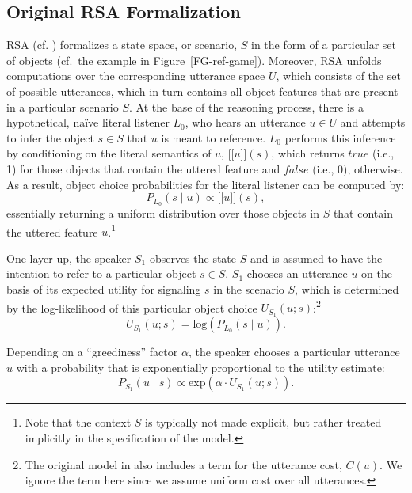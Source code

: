 \documentclass[10pt,a4paper]{article}
\newcommand{\sem}[1]{\mbox{$[\![$#1$]\!]$}}
\begin{document}
\subsection*{Original RSA Formalization}
RSA (cf. ) formalizes a state space, or scenario, $S$ in the form of a particular set of objects (cf.~the example in Figure~\ref{FG-ref-game}). 
Moreover, RSA unfolds computations over the corresponding utterance space $U$, which consists of the set of possible utterances, which in turn contains all object features that are present in a particular scenario $S$.
At the base of the reasoning process, there is a hypothetical, na\"ive literal listener $L_0$, who hears an utterance $u\in U$ and attempts to infer the object $s \in S$ that $u$ is meant to reference. 
$L_0$ performs this inference by conditioning on the literal semantics of $u$, \sem{$u$}$(s)$, which returns $true$ (i.e., 1) for those objects that contain the uttered feature and $false$ (i.e., 0), otherwise.
As a result, object choice probabilities for the literal listener can be computed by: 
\begin{equation}
P_{L_{0}}(s\mid u) \propto \sem{$u$}(s),
\end{equation}
essentially returning a uniform distribution over those objects in $S$ that contain the uttered feature $u$.\footnote{Note that the context $S$ is typically not made explicit, but rather treated implicitly in the specification of the model.}


One layer up, the speaker $S_1$ observes the state $S$ and is assumed to have the intention to refer to a particular object $s \in S$.
$S_1$ chooses an utterance $u$ on the basis of its expected utility for signaling $s$ in the scenario $S$, which is determined by the log-likelihood of this particular object choice $U_{S_1}(u;s)$:\footnote{The original model in  also includes a term for the utterance cost, $C(u)$. We ignore the term here since we assume uniform cost over all utterances.}
\begin{equation}
U_{S_{1}}(u;s) = \textrm{log}(P_{L_{0}}(s \mid u)).
\end{equation}

Depending on a ``greediness'' factor $\alpha$, the speaker chooses a particular utterance $u$ with a probability that is exponentially proportional to the utility estimate: 
\begin{equation}
P_{S_{1}} (u \mid s) \propto   \textrm{exp}(\alpha \cdot U_{S_{1}} (u;s)).
\end{equation}
\end{document}
